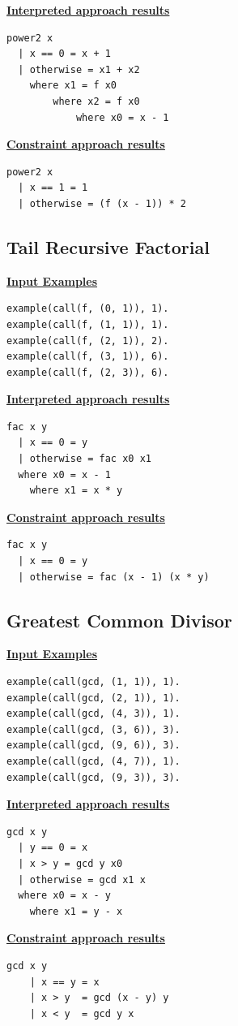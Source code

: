 \begin{multicols}{2}
\underline{\textbf{Interpreted approach results}}
\begin{lstlisting}
power2 x
  | x == 0 = x + 1
  | otherwise = x1 + x2
  	where x1 = f x0
  		where x2 = f x0
  			where x0 = x - 1
\end{lstlisting}
\columnbreak
\underline{\textbf{Constraint approach results}}
\begin{lstlisting}
power2 x
  | x == 1 = 1
  | otherwise = (f (x - 1)) * 2 
\end{lstlisting}
\end{multicols}

\subsection{Tail Recursive Factorial}
\underline{\textbf{Input Examples}}
\begin{lstlisting}
example(call(f, (0, 1)), 1).
example(call(f, (1, 1)), 1).
example(call(f, (2, 1)), 2).
example(call(f, (3, 1)), 6).
example(call(f, (2, 3)), 6).
\end{lstlisting}

\begin{multicols}{2}
\underline{\textbf{Interpreted approach results}}

\begin{lstlisting}
fac x y
  | x == 0 = y
  | otherwise = fac x0 x1
  where x0 = x - 1
  	where x1 = x * y
\end{lstlisting}
\columnbreak
\underline{\textbf{Constraint approach results}}
\begin{lstlisting}
fac x y
  | x == 0 = y
  | otherwise = fac (x - 1) (x * y)
\end{lstlisting}
\end{multicols}
\pagebreak
\subsection{Greatest Common Divisor}
\underline{\textbf{Input Examples}}
\begin{lstlisting}
example(call(gcd, (1, 1)), 1).
example(call(gcd, (2, 1)), 1).
example(call(gcd, (4, 3)), 1).
example(call(gcd, (3, 6)), 3).
example(call(gcd, (9, 6)), 3).
example(call(gcd, (4, 7)), 1).
example(call(gcd, (9, 3)), 3).
\end{lstlisting}
\begin{multicols}{2}
\underline{\textbf{Interpreted approach results}}
\begin{lstlisting}
gcd x y
  | y == 0 = x
  | x > y = gcd y x0
  | otherwise = gcd x1 x
  where x0 = x - y
  	where x1 = y - x
\end{lstlisting}
\vspace*{\fill}
\columnbreak
\underline{\textbf{Constraint approach results}}
\begin{lstlisting}
gcd x y
	| x == y = x
	| x > y	 = gcd (x - y) y
	| x < y	 = gcd y x
\end{lstlisting}
\end{multicols}

